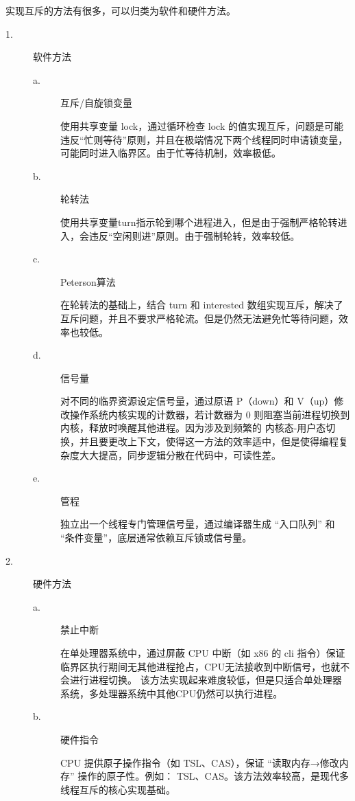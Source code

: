 \documentclass[UTF8]{ctexart}
\begin{document}
实现互斥的方法有很多，可以归类为软件和硬件方法。
\begin{description}
    \item[1.] 软件方法 
    \begin{description}
        \item[a.] 互斥/自旋锁变量
        
            使用共享变量 lock，通过循环检查 lock 的值实现互斥，问题是可能违反“忙则等待”原则，并且在极端情况下两个线程同时申请锁变量，可能同时进入临界区。由于忙等待机制，效率极低。
        \item[b.] 轮转法
        
        使用共享变量turn指示轮到哪个进程进入，但是由于强制严格轮转进入，会违反“空闲则进”原则。由于强制轮转，效率较低。
        \item[c.] Peterson算法
        
        在轮转法的基础上，结合 turn 和 interested 数组实现互斥，解决了互斥问题，并且不要求严格轮流。但是仍然无法避免忙等待问题，效率也较低。
        \item[d.] 信号量
        
        对不同的临界资源设定信号量，通过原语 P（down）和 V（up）修改操作系统内核实现的计数器，若计数器为 0 则阻塞当前进程切换到内核，释放时唤醒其他进程。因为涉及到频繁的
        内核态-用户态切换，并且要更改上下文，使得这一方法的效率适中，但是使得编程复杂度大大提高，同步逻辑分散在代码中，可读性差。
        \item[e.] 管程
        
        独立出一个线程专门管理信号量，通过编译器生成 “入口队列” 和 “条件变量”，底层通常依赖互斥锁或信号量。


    \end{description}
    \item[2.] 硬件方法
        \begin{description}
        \item[a.] 禁止中断
        
        在单处理器系统中，通过屏蔽 CPU 中断（如 x86 的 cli 指令）保证临界区执行期间无其他进程抢占，CPU无法接收到中断信号，也就不会进行进程切换。
        该方法实现起来难度较低，但是只适合单处理器系统，多处理器系统中其他CPU仍然可以执行进程。

        \item[b.] 硬件指令
        
        CPU 提供原子操作指令（如 TSL、CAS），保证 “读取内存→修改内存” 操作的原子性。例如：
TSL、CAS。该方法效率较高，是现代多线程互斥的核心实现基础。



    \end{description}
\end{description}
\end{document}
